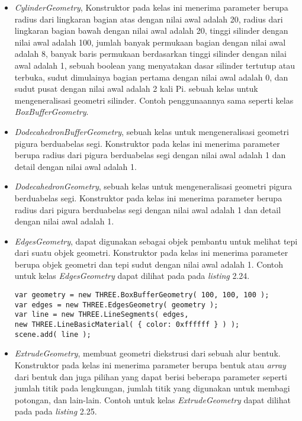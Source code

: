 \begin{itemize}
\begin{itemize}
	\item {\it CylinderGeometry}, Konstruktor pada kelas ini menerima parameter berupa radius dari lingkaran bagian atas dengan nilai awal adalah 20, radius dari lingkaran bagian bawah dengan nilai awal adalah 20, tinggi silinder dengan nilai awal adalah 100, jumlah banyak permukaan bagian dengan nilai awal adalah 8, banyak baris permukaan berdasarkan tinggi silinder dengan nilai awal adalah 1, sebuah boolean yang menyatakan dasar silinder tertutup atau terbuka, sudut dimulainya bagian pertama dengan nilai awal adalah 0, dan sudut pusat dengan nilai awal adalah 2 kali Pi. sebuah kelas untuk mengeneralisasi geometri silinder. Contoh penggunaannya sama seperti kelas {\it BoxBufferGeometry}.

	\item {\it DodecahedronBufferGeometry}, sebuah kelas untuk mengeneralisasi geometri pigura berduabelas segi. Konstruktor pada kelas ini menerima parameter berupa radius dari pigura berduabelas segi dengan nilai awal adalah 1 dan detail dengan nilai awal adalah 1.

	\item {\it DodecahedronGeometry}, sebuah kelas untuk mengeneralisasi geometri pigura berduabelas segi. Konstruktor pada kelas ini menerima parameter berupa radius dari pigura berduabelas segi dengan nilai awal adalah 1 dan detail dengan nilai awal adalah 1.

	\item {\it EdgesGeometry}, dapat digunakan sebagai objek pembantu untuk melihat tepi dari suatu objek geometri. Konstruktor pada kelas ini menerima parameter berupa objek geometri dan tepi sudut dengan nilai awal adalah 1. Contoh untuk kelas {\it EdgesGeometry} dapat dilihat pada pada {\it listing} 2.24.
	
\begin{lstlisting}[caption={Contoh penggunaan kelas {\it EdgesGeometry}.},captionpos=b]
var geometry = new THREE.BoxBufferGeometry( 100, 100, 100 );
var edges = new THREE.EdgesGeometry( geometry );
var line = new THREE.LineSegments( edges,
new THREE.LineBasicMaterial( { color: 0xffffff } ) );
scene.add( line );
\end{lstlisting}

	\item {\it ExtrudeGeometry}, membuat geometri diekstrusi dari sebuah alur bentuk. Konstruktor pada kelas ini menerima parameter berupa bentuk atau {\it array} dari bentuk dan juga pilihan yang dapat berisi beberapa parameter seperti jumlah titik pada lengkungan, jumlah titik yang digunakan untuk membagi potongan, dan lain-lain. Contoh untuk kelas {\it ExtrudeGeometry} dapat dilihat pada pada {\it listing} 2.25.
	

\end{itemize}
\end{itemize}

